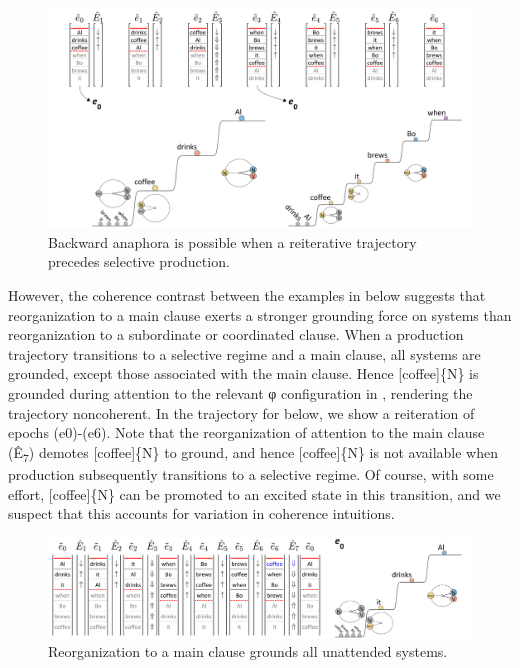 \begin{figure}
\includegraphics[width=\textwidth]{figures/Tilsen-img154.png}
\caption{Backward anaphora is possible when a reiterative trajectory precedes selective production.}
\label{fig:7:10}
\end{figure}
 

  However, the coherence contrast between the examples in  below suggests that reorganization to a main clause exerts a stronger grounding force on systems than reorganization to a subordinate or coordinated clause. When a production trajectory transitions to a selective regime and a main clause, all systems are grounded, except those associated with the main clause. Hence [coffee]\{N\} is grounded during attention to the relevant φ configuration in , rendering the trajectory noncoherent. In the trajectory for  below, we show a reiteration of epochs (e0)-(e6). Note that the reorganization of attention to the main clause (Ê\textsubscript{7}) demotes [coffee]\{N\} to ground, and hence [coffee]\{N\} is not available when production subsequently transitions to a selective regime. Of course, with some effort, [coffee]\{N\} can be promoted to an excited state in this transition, and we suspect that this accounts for variation in coherence intuitions. 

\ea\label{ex:7:2}
\z
\z
  
\begin{figure}
\includegraphics[width=\textwidth]{figures/Tilsen-img155.png}
\caption{Reorganization to a main clause grounds all unattended systems.}
\label{fig:7:11}
\end{figure}
 


